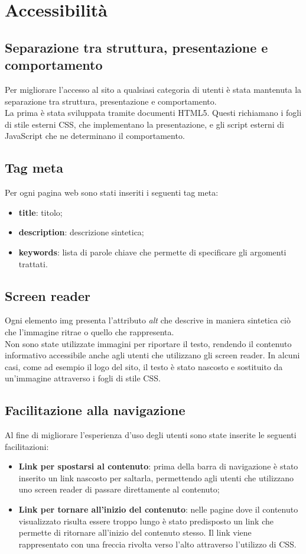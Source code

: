 \section{Accessibilità}
\subsection{Separazione tra struttura, presentazione e comportamento}
Per migliorare l'accesso al sito a qualsiasi categoria di utenti è stata mantenuta la separazione tra struttura, presentazione e comportamento. \\
La prima è stata sviluppata tramite documenti HTML5. Questi richiamano i fogli di stile esterni CSS, che implementano la presentazione, e gli script esterni di JavaScript che ne determinano il comportamento.
\subsection{Tag meta}
Per ogni pagina web sono stati inseriti i seguenti tag meta:
\begin{itemize}
	\item \textbf{title}: titolo;
	\item \textbf{description}: descrizione sintetica;
	\item \textbf{keywords}: lista di parole chiave che permette di specificare gli argomenti trattati. 
\end{itemize}
\subsection{Screen reader}
Ogni elemento img presenta l'attributo \textit{alt} che descrive in maniera sintetica ciò che l'immagine ritrae o quello che rappresenta. \\ 
Non sono state utilizzate immagini per riportare il testo, rendendo il contenuto informativo accessibile anche agli utenti che utilizzano gli screen reader. In alcuni casi, come ad esempio il logo del sito, il testo è stato nascosto e sostituito da un'immagine attraverso i fogli di stile CSS.

\subsection{Facilitazione alla navigazione}
Al fine di migliorare l'esperienza d'uso degli utenti sono state inserite le seguenti facilitazioni:
\begin{itemize}
	\item \textbf{Link per spostarsi al contenuto}: prima della barra di navigazione è stato inserito un link nascosto per saltarla, permettendo agli utenti che utilizzano uno screen reader di passare direttamente al contenuto;
	\item \textbf{Link per tornare all'inizio del contenuto}: nelle pagine dove il contenuto visualizzato risulta essere troppo lungo è stato predisposto un link che permette di ritornare all'inizio del contenuto stesso. Il link viene rappresentato con una freccia rivolta verso l'alto attraverso l'utilizzo di CSS.
\end{itemize}
\newpage